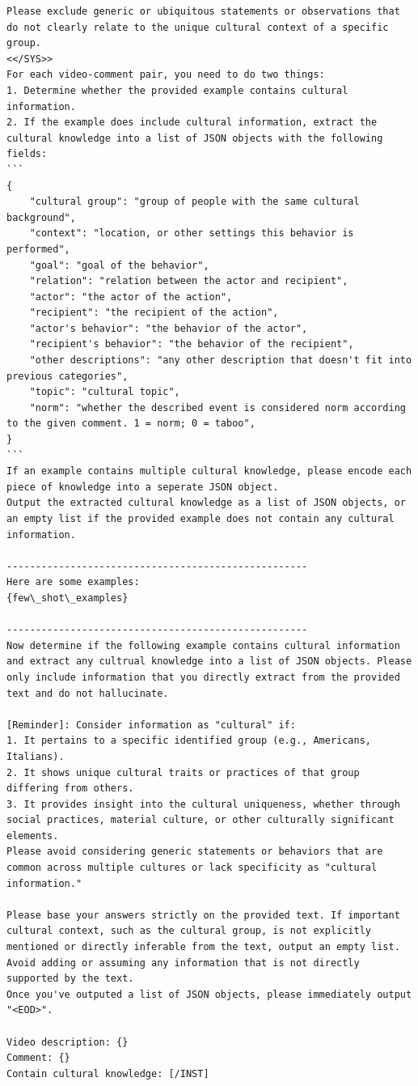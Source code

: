\documentclass{article} %
\begin{document}
\begin{lstlisting}[language={}, caption=Prompt for Llama-2-70B on descriptor extraction, label=lst:knowledge_extraction_prompt]
Please exclude generic or ubiquitous statements or observations that do not clearly relate to the unique cultural context of a specific group.
<</SYS>>
For each video-comment pair, you need to do two things:
1. Determine whether the provided example contains cultural information.
2. If the example does include cultural information, extract the cultural knowledge into a list of JSON objects with the following fields:
```
{
    "cultural group": "group of people with the same cultural background",
    "context": "location, or other settings this behavior is performed",
    "goal": "goal of the behavior",
    "relation": "relation between the actor and recipient",
    "actor": "the actor of the action",
    "recipient": "the recipient of the action",
    "actor's behavior": "the behavior of the actor",
    "recipient's behavior": "the behavior of the recipient",
    "other descriptions": "any other description that doesn't fit into previous categories",
    "topic": "cultural topic",
    "norm": "whether the described event is considered norm according to the given comment. 1 = norm; 0 = taboo",
}
```
If an example contains multiple cultural knowledge, please encode each piece of knowledge into a seperate JSON object.
Output the extracted cultural knowledge as a list of JSON objects, or an empty list if the provided example does not contain any cultural information.

----------------------------------------------------
Here are some examples: 
{few\_shot\_examples}

----------------------------------------------------
Now determine if the following example contains cultural information and extract any cultrual knowledge into a list of JSON objects. Please only include information that you directly extract from the provided text and do not hallucinate.

[Reminder]: Consider information as "cultural" if:
1. It pertains to a specific identified group (e.g., Americans, Italians).
2. It shows unique cultural traits or practices of that group differing from others.
3. It provides insight into the cultural uniqueness, whether through social practices, material culture, or other culturally significant elements.
Please avoid considering generic statements or behaviors that are common across multiple cultures or lack specificity as "cultural information."

Please base your answers strictly on the provided text. If important cultural context, such as the cultural group, is not explicitly mentioned or directly inferable from the text, output an empty list. Avoid adding or assuming any information that is not directly supported by the text.
Once you've outputed a list of JSON objects, please immediately output "<EOD>".

Video description: {}
Comment: {}
Contain cultural knowledge: [/INST]
\end{lstlisting}
\end{document}
